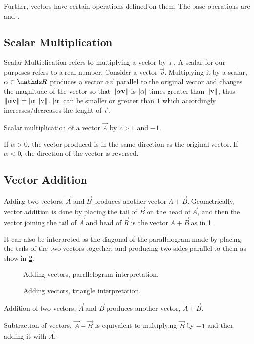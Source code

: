 Further, vectors have certain operations defined on them. The base operations
are  and .

\subsection{Scalar Multiplication}  

Scalar Multiplication refers to multiplying a vector by a . A scalar
for our purposes refers to a real number. Consider a vector \(\vec{v}\).
Multiplying it by a scalar, \(\alpha \in \RR\) produces a vector 
\(\alpha\vec{v}\) parallel to the original vector and changes the magnitude of the vector so that
\(\norm{\alpha\mathbf{\boldsymbol{v}}}\) is \(\abs{\alpha}\) times greater than \(\norm{\mathbf{\boldsymbol{v}}}\), thus
\(\norm{\alpha \mathbf{\boldsymbol{v}}} = \abs{\alpha}\norm{\mathbf{\boldsymbol{v}}}\). \(\abs{\alpha}\) can 
be smaller or greater than \(1\) which accordingly increases/decreases the 
lenght of \(\vec{v}\).

\begin{marginfigure}
  \centering
  \caption{Scalar multiplication of a vector \(\vec{A}\) by \(c > 1\) and \(-1\).}
\end{marginfigure}

If \(\alpha > 0\), the vector produced is in the same direction as the original vector. If
\(\alpha < 0\), the direction of the vector is reversed. 

\subsection{Vector Addition}

Adding two vectors, \(\vec{A}\) and \(\vec{B}\) produces another 
vector \(\vec{A + B}\). Geometrically, vector addition is done by placing
the tail of \(\vec{B}\) on the head of \(\vec{A}\), and then the vector joining
the tail of \(\vec{A}\) and head of \(\vec{B}\) is the vector \(\vec{A + B}\) as 
in \cref{subfig: vectoradd1}.

It can also be interpreted as the diagonal of the parallelogram made by placing
the tails of the two vectors together, and producing two sides parallel to them as 
show in \cref{subfig: vectoradd2}.

\begin{marginfigure}
  \centering
  \begin{subfigure}[t]{\marginparwidth}
  \caption{Adding vectors, parallelogram interpretation.}
  \label{subfig: vectoradd1}
  \end{subfigure}
  \begin{subfigure}[t]{\marginparwidth}
  \caption{Adding vectors, triangle interpretation.}
  \label{subfig: vectoradd2}
  \end{subfigure}
  \caption{Addition of two vectors, \(\vec{A}\) and \(\vec{B}\) produces another
  vector, \(\vec{A + B}\).}
\end{marginfigure}

Subtraction of vectors, \(\vec{A} - \vec{B}\) is equivalent to multiplying \(\vec{B}\) 
by \(-1\) and then adding it with \(\vec{A}\).